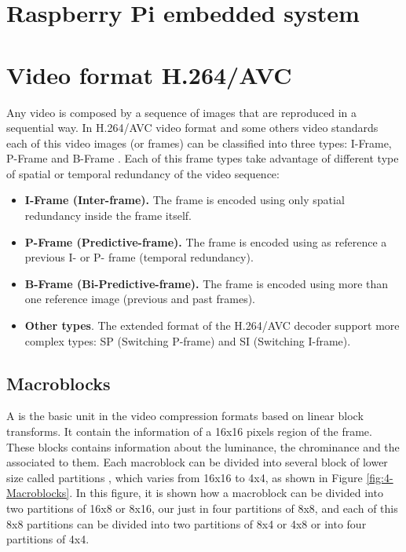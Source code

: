 \section{Raspberry Pi embedded system}




\section{Video format H.264/AVC}
\label{subsect:H.264}
Any video is composed by a sequence of images that are reproduced in a sequential way. In H.264/AVC video format and some others video standards each of this video images (or frames) can be classified into three types: I-Frame, P-Frame and B-Frame \cite{SC11}. Each of this frame types take advantage of different type of spatial or temporal redundancy of the video sequence: 
\begin{itemize}
	\item \textbf{I-Frame (Inter-frame).} The frame is encoded using only spatial redundancy inside the frame itself.
	\item \textbf{P-Frame (Predictive-frame).} The frame is encoded using as reference a previous I- or P- frame (temporal redundancy).
	\item \textbf{B-Frame (Bi-Predictive-frame).} The frame is encoded using more than one reference image (previous and past frames).
	\item \textbf{Other types}. The extended format of the H.264/AVC decoder support more complex types: SP (Switching P-frame) and SI (Switching I-frame).
\end{itemize}

\subsection{Macroblocks}
\label{subsect:Macroblocks}
A  is the basic unit in the video compression formats based on linear block transforms. It contain the information of a 16x16 pixels region of the frame. These blocks contains information about the luminance, the chrominance and the  associated to them. Each macroblock can be divided into several block of lower size called partitions \cite{Gir14}, which varies from 16x16 to 4x4, as shown in Figure \ref{fig:4-Macroblocks}. In this figure, it is shown how a macroblock can be divided into two partitions of 16x8 or 8x16, our just in four partitions of 8x8, and each of this 8x8 partitions can be divided into two partitions of 8x4 or 4x8 or into four partitions of 4x4.

